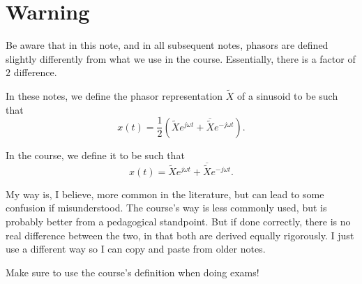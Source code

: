 \documentclass[letterpaper]{article}
\theoremstyle{remark}
\renewcommand{\tilde}[1]{\widetilde{#1}}
\begin{document}
\setcounter{section}{0}
\renewcommand{\thesection}{\Alph{section}}
\section{Warning}
Be aware that in this note, and in all subsequent notes, phasors are defined slightly differently from what we use in the course. Essentially, there is a factor of $2$ difference.

In these notes, we define the phasor representation $\tilde{X}$ of a sinusoid to be such that
\[
    x(t) = \frac{1}{2} (\tilde{X} e^{j\omega t} + \overline{\tilde{X}} e^{-j\omega t}).
\]

In the course, we define it to be such that
\[
    x(t) = \tilde{X} e^{j\omega t} + \overline{\tilde{X}} e^{-j\omega t}.
\]

My way is, I believe, more common in the literature, but can lead to some confusion if misunderstood. The course's way is less commonly used, but is probably better from a pedagogical standpoint. But if done correctly, there is no real difference between the two, in that both are derived equally rigorously. I just use a different way so I can copy and paste from older notes. 

Make sure to use the course's definition when doing exams!
\end{document}
